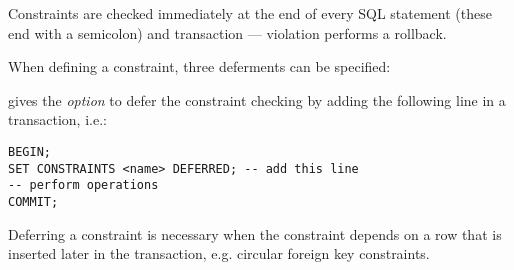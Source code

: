 Constraints are checked immediately at the end of every SQL statement (these end with a semicolon) and transaction --- violation performs a rollback.

When defining a constraint, three deferments can be specified:
\begin{enumerate*}
\end{enumerate*}

 gives the \textit{option} to defer the constraint checking by adding the following line in a transaction, i.e.:

\begin{lstlisting}
BEGIN;
SET CONSTRAINTS <name> DEFERRED; -- add this line
-- perform operations
COMMIT;
\end{lstlisting}

Deferring a constraint is necessary when the constraint depends on a row that is inserted later in the transaction, e.g. circular foreign key constraints.
